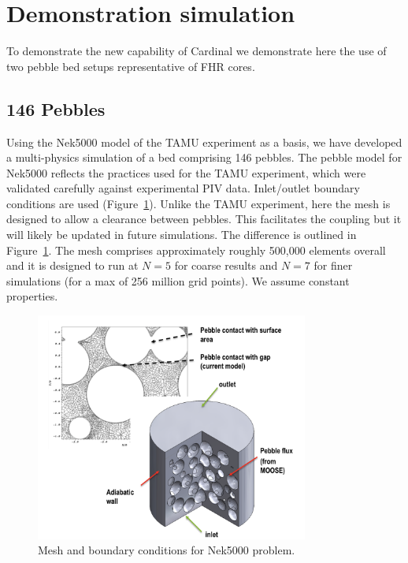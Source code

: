 \section{Demonstration simulation}
\label{s:demo}

To demonstrate the new capability of Cardinal we demonstrate here the use of two pebble bed setups representative of FHR cores.

\subsection{146 Pebbles}
\label{ss:c4}

Using the Nek5000 model of the TAMU experiment as a basis, we have developed a multi-physics simulation of a bed comprising 146 pebbles.
The pebble model for Nek5000 reflects the practices used for the TAMU experiment, which were validated carefully against experimental PIV data. Inlet/outlet boundary conditions are used (Figure~\ref{f:pb2}). Unlike the TAMU experiment, here the mesh is designed to allow a clearance between pebbles. This facilitates the coupling but it will likely be updated in future simulations. The difference is outlined in Figure~\ref{f:pb2}. The mesh comprises approximately roughly 500,000 elements overall and it is designed to run at $N=5$ for coarse results and $N=7$ for finer simulations (for a max of 256 million grid points). We assume constant properties.

\begin{figure}[!h]
\centering
\includegraphics[clip=true,width=0.8\textwidth]{Figures/pb_mesh}
\caption{Mesh and boundary conditions for Nek5000 problem.}
\label{f:pb2}
\end{figure}

